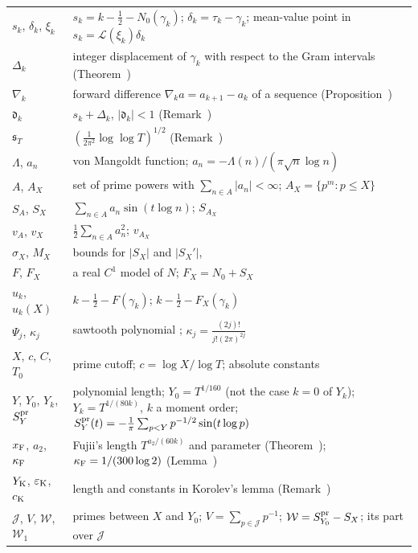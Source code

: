 \documentclass[preprint,12pt]{elsarticle}
\makeatletter
\let\CG@origref\ref
\let\CG@origeqref\eqref
\newcommand{\CG@gettip}[1]{\@ifundefined{CGTip@#1}{Reference: #1}{\csname CGTip@#1\endcsname}}
\DeclareRobustCommand{\CGref}[1]{\pdftooltip{\CG@origref{#1}}{\CG@gettip{#1}}}
\DeclareRobustCommand{\CGeqref}[1]{\pdftooltip{\CG@origeqref{#1}}{\CG@gettip{#1}}}
\numberwithin{equation}{section}
\theoremstyle{plain}
\theoremstyle{definition}
\theoremstyle{remark}
\newcommand{\NO}{N_0}
\newcommand{\lL}{\mathcal L}
\makeatother
\begin{document}
\begin{center}
\begin{longtable}{p{}p{}}
$s_k$, $\delta_k$, $\xi_k$ & $s_k=k-\frac12-\NO(\gamma_k)$; $\delta_k=\tau_k-\gamma_k$; mean-value point in $s_k=\lL(\xi_k)\delta_k$\\
$\Delta_k$ & integer displacement of $\gamma_k$ with respect to the Gram intervals (Theorem~\CGref{thm:known_korolev})\\
$\nabla_k$ & forward difference $\nabla_ka=a_{k+1}-a_k$ of a sequence (Proposition~\CGref{prop:deformation})\\
$\mathfrak d_k$ & $s_k+\Delta_k$, $|\mathfrak d_k|<1$ (Remark~\CGref{rem:korolev})\\
$\mathfrak s_T$ & $(\frac1{2\pi^2}\log\log T)^{1/2}$ (Remark~\CGref{rem:korolev})\\
$\Lambda$, $a_n$ & von Mangoldt function; $a_n=-\Lambda(n)/(\pi\sqrt n\log n)$\\
$A$, $A_X$ & set of prime powers with $\sum_{n\in A}|a_n|<\infty$; $A_X=\{p^m:p\le X\}$\\
$S_A$, $S_X$ & $\sum_{n\in A}a_n\sin(t\log n)$; $S_{A_X}$\\
$v_A$, $v_X$ & $\frac12\sum_{n\in A}a_n^2$; $v_{A_X}$\\
$\sigma_X$, $M_X$ & bounds for $|S_X|$ and $|S_X'|$, \CGeqref{eq:sigma_M_def}\\
$F$, $F_X$ & a real $C^1$ model of $N$; $F_X=\NO+S_X$\\
$u_k$, $u_k(X)$ & $k-\frac12-F(\gamma_k)$; $k-\frac12-F_X(\gamma_k)$\\
$\Psi_j$, $\kappa_j$ & sawtooth polynomial \CGeqref{eq:Psi_def}; $\kappa_j=\frac{(2j)!}{j!(2\pi)^{2j}}$\\
$X$, $c$, $C$, $T_0$ & prime cutoff; $c=\log X/\log T$; absolute constants\\
$Y$, $Y_0$, $Y_k$, $S^{\rm pr}_Y$ & polynomial length; $Y_0=T^{1/160}$ (not the case $k=0$ of $Y_k$); $Y_k=T^{1/(80k)}$, $k$ a moment order; $S^{\rm pr}_Y(t)=-\frac1\pi\sum_{p<Y}p^{-1/2}\sin(t\log p)$\\
$x_{\rm F}$, $a_2$, $\kappa_{\rm F}$ & Fujii's length $T^{a_2/(60k)}$ and parameter (Theorem~\CGref{thm:known_fujii_selberg}); $\kappa_{\rm F}=1/(300\log2)$ (Lemma~\CGref{lem:selberg_uniform})\\
$Y_{\rm K}$, $\varepsilon_{\rm K}$, $c_{\rm K}$ & length and constants in Korolev's lemma (Remark~\CGref{rem:korolev_uniform})\\
$\mathcal J$, $V$, $\mathcal W$, $\mathcal W_1$ & primes between $X$ and $Y_0$; $V=\sum_{p\in\mathcal J}p^{-1}$; $\mathcal W=S^{\rm pr}_{Y_0}-S_X$; its part over $\mathcal J$ \CGeqref{eq:D_def}\\

\end{longtable}
\end{center}
\end{document}
